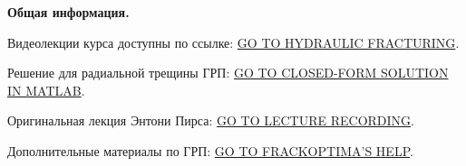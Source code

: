 \documentclass[main.tex]{subfiles}
\begin{document}
\textbf{Общая информация.}

Видеолекции курса доступны по ссылке: \href{https://youtube.com/playlist?list=PLipUmK_65GXEpFTHhfJBaiiv7XiwMg-PM}{GO TO HYDRAULIC FRACTURING}.

Решение для радиальной трещины ГРП: \href{https://datadryad.org/stash/dataset/doi:10.5061/dryad.gh469}{GO TO CLOSED-FORM SOLUTION IN MATLAB}.

Оригинальная лекция Энтони Пирса: \href{https://www.youtube.com/watch?v=PXfy5f9kWh4}{GO TO LECTURE RECORDING}.

Дополнительные материалы по ГРП: \href{http://www.frackoptima.com/userguide/index.html}{GO TO FRACKOPTIMA'S HELP}.
\end{document}
